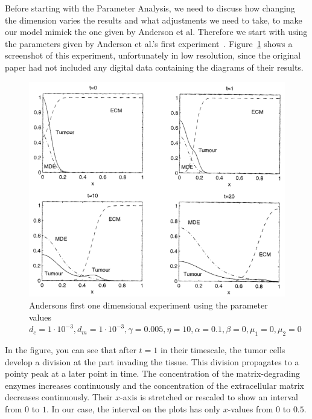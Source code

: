 Before starting with the Parameter Analysis, we need to discuss how changing the dimension varies the results and what adjustments we need to take, to make our model mimick the one given by Anderson et al. Therefore we start with using the parameters given by Anderson et al.'s first experiment~\cite{anderson_mathematical_2000}. Figure~\ref{fig:anderson_experiment} shows a screenshot of this experiment, unfortunately in low resolution, since the original paper had not included any digital data containing the diagrams of their results.
\begin{figure}[ht!]
 \centering
 \includegraphics[width=\textwidth]{resources/images/anderson_experiment.png}
 \caption{Andersons first one dimensional experiment using the parameter values $d_c = 1\cdot 10^{-3}, d_m = 1\cdot 10^{-3}, \gamma = 0.005, \eta = 10, \alpha = 0.1, \beta = 0, \mu_1 = 0, \mu_2 = 0$}
 \label{fig:anderson_experiment}
\end{figure}
In the figure, you can see that after $t=1$ in their timescale, the tumor cells develop a division at the part invading the tissue. This division propagates to a pointy peak at a later point in time. The concentration of the matrix-degrading enzymes increases continuously and the concentration of the extracellular matrix decreases continuously. Their $x$-axis is stretched or rescaled to show an interval from $0$ to $1$. In our case, the interval on the plots has only $x$-values from $0$ to $0.5$.

